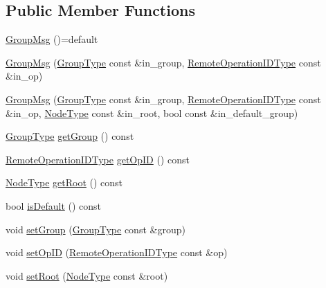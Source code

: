 \subsection*{Public Member Functions}
\begin{DoxyCompactItemize}
\item 
\hyperlink{structvt_1_1group_1_1_group_msg_a219a5c51a93a60b1ace49a17503fdfc0}{Group\+Msg} ()=default
\item 
\hyperlink{structvt_1_1group_1_1_group_msg_af022390a490fffce73208c94efb4545b}{Group\+Msg} (\hyperlink{namespacevt_a27b5e4411c9b6140c49100e050e2f743}{Group\+Type} const \&in\+\_\+group, \hyperlink{namespacevt_1_1group_a73f2624ddeb535b39a08b6524f26b244}{Remote\+Operation\+I\+D\+Type} const \&in\+\_\+op)
\item 
\hyperlink{structvt_1_1group_1_1_group_msg_a9ce944b6890d16ade1cb58d3f326c3b2}{Group\+Msg} (\hyperlink{namespacevt_a27b5e4411c9b6140c49100e050e2f743}{Group\+Type} const \&in\+\_\+group, \hyperlink{namespacevt_1_1group_a73f2624ddeb535b39a08b6524f26b244}{Remote\+Operation\+I\+D\+Type} const \&in\+\_\+op, \hyperlink{namespacevt_a866da9d0efc19c0a1ce79e9e492f47e2}{Node\+Type} const \&in\+\_\+root, bool const \&in\+\_\+default\+\_\+group)
\item 
\hyperlink{namespacevt_a27b5e4411c9b6140c49100e050e2f743}{Group\+Type} \hyperlink{structvt_1_1group_1_1_group_msg_ad0879ce5e25a0dae015bef8eae74f507}{get\+Group} () const
\item 
\hyperlink{namespacevt_1_1group_a73f2624ddeb535b39a08b6524f26b244}{Remote\+Operation\+I\+D\+Type} \hyperlink{structvt_1_1group_1_1_group_msg_a5dd1bb7ec287e2ff5d93537a6652c89e}{get\+Op\+ID} () const
\item 
\hyperlink{namespacevt_a866da9d0efc19c0a1ce79e9e492f47e2}{Node\+Type} \hyperlink{structvt_1_1group_1_1_group_msg_ad37e50e1a83cf6dd1101a34b36818707}{get\+Root} () const
\item 
bool \hyperlink{structvt_1_1group_1_1_group_msg_aedab140ac671d3a1830bafd787d8f780}{is\+Default} () const
\item 
void \hyperlink{structvt_1_1group_1_1_group_msg_a69b6ab8f196f0e84ffa52a2c71ddbe3f}{set\+Group} (\hyperlink{namespacevt_a27b5e4411c9b6140c49100e050e2f743}{Group\+Type} const \&group)
\item 
void \hyperlink{structvt_1_1group_1_1_group_msg_a73a11643f98e6407ca3045ce36191955}{set\+Op\+ID} (\hyperlink{namespacevt_1_1group_a73f2624ddeb535b39a08b6524f26b244}{Remote\+Operation\+I\+D\+Type} const \&op)
\item 
void \hyperlink{structvt_1_1group_1_1_group_msg_a057bd3c887231efe7824679ad9cb6e8d}{set\+Root} (\hyperlink{namespacevt_a866da9d0efc19c0a1ce79e9e492f47e2}{Node\+Type} const \&root)
\end{DoxyCompactItemize}
